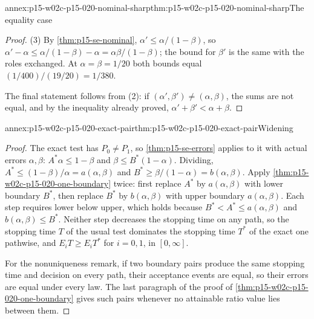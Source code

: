 \begin{annexitem}{annex:p15-w02c-p15-020-nominal-sharp}{thm:p15-w02c-p15-020-nominal-sharp}{The equality case}
\begin{proof}
(3) By \cref{thm:p15-se-nominal},
\(\alpha'\leq\alpha/(1-\beta)\), so
\(\alpha'-\alpha\leq\alpha/(1-\beta)-\alpha=\alpha\beta/(1-\beta)\);
the bound for \(\beta'\) is the same with the roles exchanged. At
\(\alpha=\beta=1/20\) both bounds equal
\((1/400)/(19/20)=1/380\).

The final statement follows from (2): if \((\alpha',\beta')\neq(\alpha,\beta)\),
the sums are not equal, and by the inequality already proved,
\(\alpha'+\beta'<\alpha+\beta\).
\end{proof}
\end{annexitem}

\begin{annexitem}{annex:p15-w02c-p15-020-exact-pair}{thm:p15-w02c-p15-020-exact-pair}{Widening}
\begin{proof}
The exact test has \(P_0\neq P_1\), so \cref{thm:p15-se-errors}
applies to it with actual errors \(\alpha,\beta\):
\(A^*\alpha\leq1-\beta\) and \(\beta\leq B^*(1-\alpha)\). Dividing,
\(A^*\leq(1-\beta)/\alpha=a(\alpha,\beta)\) and
\(B^*\geq\beta/(1-\alpha)=b(\alpha,\beta)\).
Apply \cref{thm:p15-w02c-p15-020-one-boundary} twice: first replace
\(A^*\) by \(a(\alpha,\beta)\) with lower boundary \(B^*\), then replace
\(B^*\) by \(b(\alpha,\beta)\) with upper boundary \(a(\alpha,\beta)\).
Each step requires lower below upper, which holds because
\(B^*<A^*\leq a(\alpha,\beta)\) and \(b(\alpha,\beta)\leq B^*\).
Neither step decreases the stopping time on any path, so the stopping
time \(T\) of the usual test dominates the stopping time \(T^*\) of the
exact one pathwise, and \(E_iT\geq E_iT^*\) for \(i=0,1\), in
\([0,\infty]\).

For the nonuniqueness remark, if two boundary pairs produce the same
stopping time and decision on every path, their acceptance events are
equal, so their errors are equal under every law. The last paragraph of
the proof of \cref{thm:p15-w02c-p15-020-one-boundary} gives such pairs
whenever no attainable ratio value lies between them.
\end{proof}
\end{annexitem}

